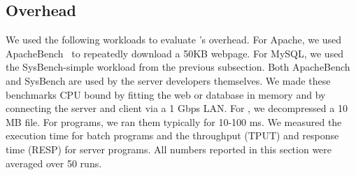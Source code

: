 

\subsection{Overhead} \label{sec:tern-overhead}

We used the following workloads to evaluate \tern's overhead.  For Apache, we
used ApacheBench~\cite{apachebench} to repeatedly download a 50KB webpage.
For MySQL, we used the SysBench-simple workload from the  previous subsection.
Both ApacheBench and SysBench are used by the server developers themselves.
We made these benchmarks CPU bound by fitting the web or
database in memory and by connecting the server and client via a 1 Gbps
LAN.  For \pbzip, we decompressed a 10 MB file.  For \splash programs, we
ran them typically for 10-100 ms.  We measured the execution time for
batch programs and the throughput (TPUT) and response time (RESP) for
server programs.  All numbers reported in this section were averaged over
50 runs.

